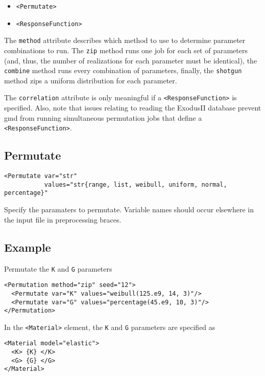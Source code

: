 \documentclass[11pt]{report}
\renewcommand{\tag}[1]{\texttt{<#1>}}
\begin{document}
\begin{itemize}
  \item \tag{Permutate}
  \item \tag{ResponseFunction}
\end{itemize}

The \texttt{method} attribute describes which method to use to determine
parameter combinations to run.  The \texttt{zip} method runs one job for each
set of parameters (and, thus, the number of realizations for each parameter
must be identical), the \texttt{combine} method runs every combination of
parameters, finally, the \texttt{shotgun} method zips a uniform distribution
for each parameter.

The \texttt{correlation} attribute is only meaningful if a
\tag{ResponseFunction} is specified.  Also, note that issues relating to
reading the ExodusII database prevent gmd from running simultaneous
permutation jobs that define a \tag{ResponseFunction}.


\subsection{Permutate}
\begin{verbatim}
<Permutate var="str"
           values="str{range, list, weibull, uniform, normal, percentage}"
\end{verbatim}
%
Specify the paramaters to permutate. Variable names should occur elsewhere in
the input file in preprocessing braces.

\subsection{Example}
Permutate the \texttt{K} and \texttt{G} parameters
%
\begin{verbatim}
<Permutation method="zip" seed="12">
  <Permutate var="K" values="weibull(125.e9, 14, 3)"/>
  <Permutate var="G" values="percentage(45.e9, 10, 3)"/>
</Permutation>
\end{verbatim}

In the \tag{Material} element, the \texttt{K} and \texttt{G} parameters are
specified as
%
\begin{verbatim}
<Material model="elastic">
  <K> {K} </K>
  <G> {G} </G>
</Material>
\end{verbatim}

\end{document}
